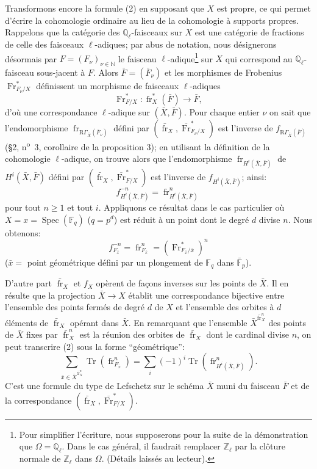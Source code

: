 \documentclass[11pt]{article}
\DeclareMathOperator{\Spec}{Spec}
\providecommand{\Tr}{\operatorname{Tr}}
\providecommand{\Tr}{\operatorname{Tr}}
\providecommand{\Tr}{\operatorname{Tr}}
\providecommand{\Tr}{\operatorname{Tr}}
\providecommand{\Spec}{\operatorname{Spec}}
\providecommand{\Spec}{\operatorname{Spec}}
\providecommand{\Spec}{\operatorname{Spec}}
\providecommand{\Tr}{\operatorname{Tr}}
\providecommand{\fr}{\operatorname{fr}}
\providecommand{\Fr}{\operatorname{Fr}}
\providecommand{\Fr}{\operatorname{Fr}}
\providecommand{\fr}{\operatorname{fr}}
\providecommand{\Spec}{\operatorname{Spec}}
\begin{document}
Transformons encore la formule (2) en supposant que $X$ est propre, ce qui permet d'écrire la cohomologie ordinaire au lieu de la cohomologie à supports propres. Rappelons que la catégorie des $\mathbb Q_\ell$-faisceaux sur $X$ est une catégorie de fractions de celle des faisceaux $\ell$-adiques; par abus de notation, nous désignerons désormais par $F=(F_\nu)_{\nu\in\mathbb N}$ le faisceau $\ell$-adique\footnote{Pour simplifier l'écriture, nous supposerons pour la suite de la démonstration que $\Omega=\mathbb Q_\ell$. Dans le cas général, il faudrait remplacer $\mathbb Z_\ell$ par la clôture normale de $\mathbb Z_\ell$ dans $\Omega$. (Détails laissés au lecteur).} sur $X$ qui correspond au $\mathbb Q_\ell$-faisceau sous-jacent à $F$. Alors $\bar F=(\bar F_\nu)$ et les morphismes de Frobenius $\Fr^*_{F_\nu/X}$ définissent un morphisme de faisceaux $\ell$-adiques
\[
\Fr^*_{F/X}:\fr_X^*(\bar F)\longrightarrow\bar F,
\]
d'où une correspondance $\ell$-adique sur $(\bar X,\bar F)$. Pour chaque entier $\nu$ on sait que l'endomorphisme $\fr_{\mathrm{R}\Gamma_{\bar X}(\bar F_\nu)}$ défini par $(\bar{\fr}_X,\overline{\Fr}^*_{F_\nu/X})$ est l'inverse de $f_{\mathrm{R}\Gamma_{\bar X}(\bar F)}$ (§2, n\textsuperscript{o}~3, corollaire de la proposition 3); en utilisant la définition de la cohomologie $\ell$-adique, on trouve alors que l'endomorphisme $\fr_{H^i(\bar X,\bar F)}$ de $H^i(\bar X,\bar F)$ défini par $(\bar{\fr}_X,\overline{\Fr}^*_{F/X})$ est l'inverse de $f_{H^i(\bar X,\bar F)}$; ainsi:
\[
f^{-n}_{H^i(\bar X,\bar F)}=\fr^n_{H^i(\bar X,\bar F)}
\]
pour tout $n\ge1$ et tout $i$.
Appliquons ce résultat dans le cas particulier où $X=x=\Spec(\mathbb F_q)$ ($q=p^d$) est réduit à un point dont le degré $d$ divise $n$. Nous obtenons:
\[
f^{-n}_{F_{\bar x}}=\fr^n_{F_{\bar x}}=(\Fr^*_{F_{\bar x}/\bar x})^n
\]
($\bar x=$ point
géométrique défini par un plongement de $\mathbb F_q$ dans $\bar{\mathbb F}_p$).

D'autre part $\bar{\fr}_X$ et $f_X$ opèrent de façons inverses sur les points de $\bar X$. Il en résulte que la projection $\bar X\to X$ établit une correspondance bijective entre l'ensemble des points fermés de degré $d$ de $X$ et l'ensemble des orbites à $d$ éléments de $\bar{\fr}_X$ opérant dans $\bar X$. En remarquant que l'ensemble $\bar X^{\bar{\fr}_X^n}$ des points de $\bar X$ fixes par $\bar{\fr}_X^n$ est la réunion des orbites de $\bar{\fr}_X$ dont le cardinal divise $n$, on peut transcrire (2) sous la forme ``géométrique'':
\[
\sum_{\bar x\in\bar X^{\bar{\fr}_X^n}}\Tr(\fr^n_{F_{\bar x}})
=\sum_i(-1)^i\Tr(\fr^n_{H^i(\bar X,\bar F)}).
\tag{2'}
\]
C'est une formule du type de Lefschetz sur le schéma $\bar X$ muni du faisceau $\bar F$ et de la correspondance $(\bar{\fr}_X,\overline{\Fr}^*_{F/X})$.
\end{document}
